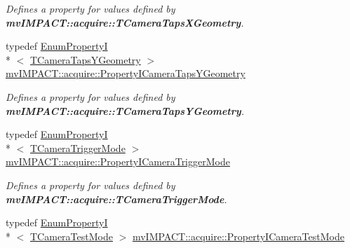 \begin{DoxyCompactItemize}
\begin{DoxyCompactList}\small\item\em Defines a property for values defined by {\bfseries mv\+I\+M\+P\+A\+C\+T\+::acquire\+::\+T\+Camera\+Taps\+X\+Geometry}. \end{DoxyCompactList}\item 
\hypertarget{group___device_specific_interface_ga8ca68a8fc0e8c81dacb76b2cfc289909}{typedef \hyperlink{classmv_i_m_p_a_c_t_1_1acquire_1_1_enum_property_i}{Enum\+Property\+I}\\*
$<$ \hyperlink{group___device_specific_interface_ga03c8b70bb46d82e4f9f4a8c154d7261c}{T\+Camera\+Taps\+Y\+Geometry} $>$ \hyperlink{group___device_specific_interface_ga8ca68a8fc0e8c81dacb76b2cfc289909}{mv\+I\+M\+P\+A\+C\+T\+::acquire\+::\+Property\+I\+Camera\+Taps\+Y\+Geometry}}\label{group___device_specific_interface_ga8ca68a8fc0e8c81dacb76b2cfc289909}

\begin{DoxyCompactList}\small\item\em Defines a property for values defined by {\bfseries mv\+I\+M\+P\+A\+C\+T\+::acquire\+::\+T\+Camera\+Taps\+Y\+Geometry}. \end{DoxyCompactList}\item 
\hypertarget{group___device_specific_interface_gad47fbc49f6f36b45b3458aef7a61849a}{typedef \hyperlink{classmv_i_m_p_a_c_t_1_1acquire_1_1_enum_property_i}{Enum\+Property\+I}\\*
$<$ \hyperlink{group___device_specific_interface_ga7d880247a3af52241ce96ba703c526a1}{T\+Camera\+Trigger\+Mode} $>$ \hyperlink{group___device_specific_interface_gad47fbc49f6f36b45b3458aef7a61849a}{mv\+I\+M\+P\+A\+C\+T\+::acquire\+::\+Property\+I\+Camera\+Trigger\+Mode}}\label{group___device_specific_interface_gad47fbc49f6f36b45b3458aef7a61849a}

\begin{DoxyCompactList}\small\item\em Defines a property for values defined by {\bfseries mv\+I\+M\+P\+A\+C\+T\+::acquire\+::\+T\+Camera\+Trigger\+Mode}. \end{DoxyCompactList}\item 
\hypertarget{group___device_specific_interface_gac0b281150a89dd23bb2a696aba431225}{typedef \hyperlink{classmv_i_m_p_a_c_t_1_1acquire_1_1_enum_property_i}{Enum\+Property\+I}\\*
$<$ \hyperlink{group___device_specific_interface_ga6e439707d908a0a14e9df8e190df76aa}{T\+Camera\+Test\+Mode} $>$ \hyperlink{group___device_specific_interface_gac0b281150a89dd23bb2a696aba431225}{mv\+I\+M\+P\+A\+C\+T\+::acquire\+::\+Property\+I\+Camera\+Test\+Mode}}\label{group___device_specific_interface_gac0b281150a89dd23bb2a696aba431225}


\end{DoxyCompactItemize}
